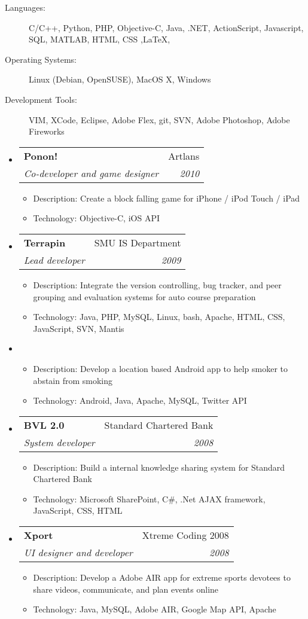 \documentclass[twoside,letterpaper,11pt]{article}
\makeatletter
\newcommand{\resitem}[1]{\item #1 \vspace{-2pt}}
\newcommand{\resheading}[1]{
  \parbox{\textwidth}{
    \begin{shaded}
      \textbf{\sffamily{\mbox{~}{\large #1} \vphantom{p\^{E}}}}
    \end{shaded}
  }
}
\newcommand{\ressubheading}[4]{
\begin{tabular*}{7in}{l@{\extracolsep{\fill}}r}
		\textbf{#1} & #2 \\
		\textit{#3} & \textit{#4} \\
\end{tabular*}\vspace{-6pt}}
\makeatother
\begin{document}
\resheading{Skills}

\begin{description}
\item[Languages:]
C/C++, Python, PHP, Objective-C, Java, .NET, ActionScript, Javascript, SQL, MATLAB, HTML, CSS ,\LaTeX, 
\item[Operating Systems:]
Linux (Debian, OpenSUSE), MacOS X, Windows
\item[Development Tools:]
VIM, XCode, Eclipse, Adobe Flex, git, SVN, Adobe Photoshop, Adobe Fireworks
\end{description}

\resheading{Projects}
\begin{itemize}
\item
	\ressubheading{Ponon!}{Artlans}{Co-developer and game designer}{2010}
	\begin{itemize}
		\resitem{Description: Create a block falling game for iPhone / iPod Touch / iPad}
		\resitem{Technology: Objective-C, iOS API}
	\end{itemize}

\item 
	\ressubheading{Terrapin}{SMU IS Department}{Lead developer}{2009}
	\begin{itemize}
		\resitem{Description: Integrate the version controlling, bug tracker, and peer grouping and evaluation systems for auto course preparation}
		\resitem{Technology: Java, PHP, MySQL, Linux, bash, Apache, HTML, CSS, JavaScript, SVN, Mantis}
	\end{itemize}

\item
	\begin{itemize}
		\resitem{Description: Develop a location based Android app to help smoker to abstain from smoking}
		\resitem{Technology: Android, Java, Apache, MySQL, Twitter API}
	\end{itemize}

\item
	\ressubheading{BVL 2.0}{Standard Chartered Bank}{System developer}{2008}
	\begin{itemize}
		\resitem{Description: Build a internal knowledge sharing system for Standard Chartered Bank}
		\resitem{Technology: Microsoft SharePoint, C\#, .Net AJAX framework, JavaScript, CSS, HTML}
	\end{itemize}

\item
	\ressubheading{Xport}{Xtreme Coding 2008}{UI designer and developer}{2008}
	\begin{itemize}
		\resitem{Description: Develop a Adobe AIR app for extreme sports devotees to share videos, communicate, and plan events online}
		\resitem{Technology: Java, MySQL, Adobe AIR, Google Map API, Apache}
	\end{itemize}


\end{itemize}
\end{document}
